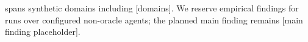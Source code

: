 \benchmark spans synthetic domains including [domains].
We reserve empirical findings for runs over configured non-oracle agents; the planned main finding remains [main finding placeholder].
